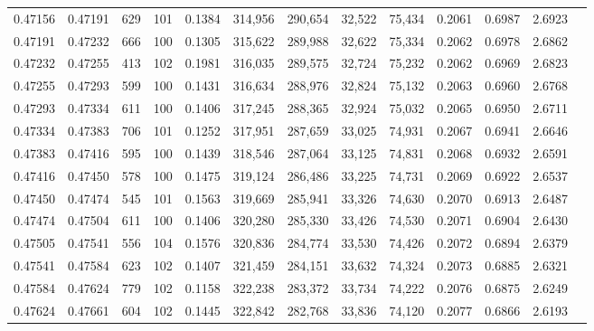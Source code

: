 \begin{tabular}{rrrrrrrrrrrrr}
0.47156 & 0.47191 &   629 & 101 &                                     0.1384 & 314,956 & 290,654 &  32,522 &  75,434 & 0.2061 & 0.6987 & 2.6923 \\
0.47191 & 0.47232 &   666 & 100 &                                     0.1305 & 315,622 & 289,988 &  32,622 &  75,334 & 0.2062 & 0.6978 & 2.6862 \\
0.47232 & 0.47255 &   413 & 102 &                                     0.1981 & 316,035 & 289,575 &  32,724 &  75,232 & 0.2062 & 0.6969 & 2.6823 \\
0.47255 & 0.47293 &   599 & 100 &                                     0.1431 & 316,634 & 288,976 &  32,824 &  75,132 & 0.2063 & 0.6960 & 2.6768 \\
0.47293 & 0.47334 &   611 & 100 &                                     0.1406 & 317,245 & 288,365 &  32,924 &  75,032 & 0.2065 & 0.6950 & 2.6711 \\
0.47334 & 0.47383 &   706 & 101 &                                     0.1252 & 317,951 & 287,659 &  33,025 &  74,931 & 0.2067 & 0.6941 & 2.6646 \\
0.47383 & 0.47416 &   595 & 100 &                                     0.1439 & 318,546 & 287,064 &  33,125 &  74,831 & 0.2068 & 0.6932 & 2.6591 \\
0.47416 & 0.47450 &   578 & 100 &                                     0.1475 & 319,124 & 286,486 &  33,225 &  74,731 & 0.2069 & 0.6922 & 2.6537 \\
0.47450 & 0.47474 &   545 & 101 &                                     0.1563 & 319,669 & 285,941 &  33,326 &  74,630 & 0.2070 & 0.6913 & 2.6487 \\
0.47474 & 0.47504 &   611 & 100 &                                     0.1406 & 320,280 & 285,330 &  33,426 &  74,530 & 0.2071 & 0.6904 & 2.6430 \\
0.47505 & 0.47541 &   556 & 104 &                                     0.1576 & 320,836 & 284,774 &  33,530 &  74,426 & 0.2072 & 0.6894 & 2.6379 \\
0.47541 & 0.47584 &   623 & 102 &                                     0.1407 & 321,459 & 284,151 &  33,632 &  74,324 & 0.2073 & 0.6885 & 2.6321 \\
0.47584 & 0.47624 &   779 & 102 &                                     0.1158 & 322,238 & 283,372 &  33,734 &  74,222 & 0.2076 & 0.6875 & 2.6249 \\
0.47624 & 0.47661 &   604 & 102 &                                     0.1445 & 322,842 & 282,768 &  33,836 &  74,120 & 0.2077 & 0.6866 & 2.6193 \\

\end{tabular}
